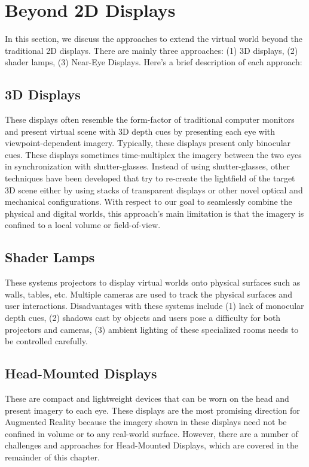 \section{Beyond 2D Displays}
\label{sec:background:beyond_2d_displays}
In this section, we discuss the approaches to extend the virtual world beyond the traditional 2D displays. 
There are mainly three approaches: (1) 3D displays, (2) shader lamps, (3) Near-Eye Displays. 
Here’s a brief description of each approach:

\subsection{3D Displays}
\label{sec:background:3d_displays}
These displays often resemble the form-factor of traditional computer monitors and present virtual scene with 3D depth cues by presenting each eye with viewpoint-dependent imagery. 
Typically, these displays present only binocular cues. 
These displays sometimes time-multiplex the imagery between the two eyes in synchronization with shutter-glasses. 
Instead of using shutter-glasses, other techniques have been developed that try to re-create the lightfield of the target 3D scene either by using stacks of transparent displays or other novel optical and mechanical configurations. 
With respect to our goal to seamlessly combine the physical and digital worlds, this approach’s main limitation is that the imagery is confined to a local volume or field-of-view.

\subsection{Shader Lamps}
\label{sec:background:shader_lamps}
These systems projectors to display virtual worlds onto physical surfaces such as walls, tables, etc. 
Multiple cameras are used to track the physical surfaces and user interactions. 
Disadvantages with these systems include 
(1) lack of monocular depth cues, 
(2) shadows cast by objects and users pose a difficulty for both projectors and cameras, 
(3) ambient lighting of these specialized rooms needs to be controlled carefully.

\subsection{Head-Mounted Displays}
These are compact and lightweight devices that can be worn on the head and present imagery to each eye. 
These displays are the most promising direction for Augmented Reality because the imagery shown in these displays need not be confined in volume or to any real-world surface. 
However, there are a number of challenges and approaches for Head-Mounted Displays, which are covered in the remainder of this chapter.

